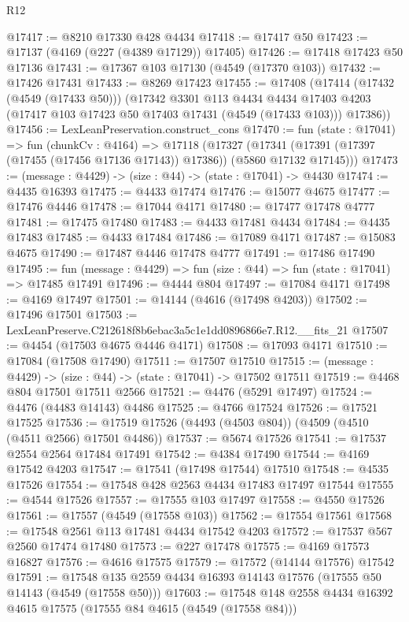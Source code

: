 \begin{lexlean}{R12}
\begin{coremodule}
@17417 := @8210 @17330 @428 @4434
@17418 := @17417 @50
@17423 := @17137 (@4169 (@227 (@4389 @17129)) @17405)
@17426 := @17418 @17423 @50 @17136
@17431 := @17367 @103 @17130 (@4549 (@17370 @103))
@17432 := @17426 @17431
@17433 := @8269 @17423
@17455 := @17408
    (@17414
      (@17432 (@4549 (@17433 @50)))
      (@17342
        @3301
        @113
        @4434
        @4434
        @17403
        @4203
        (@17417 @103 @17423 @50 @17403 @17431 (@4549 (@17433 @103)))
        @17386))
@17456 := LexLeanPreservation.construct_cons
@17470 := fun (state : @17041) =>
  fun (chunkCv : @4164) =>
  @17118
    (@17327 (@17341 (@17391 (@17397 (@17455 (@17456 @17136 @17143)) @17386)) (@5860 @17132 @17145)))
@17473 := (message : @4429) -> (size : @44) -> (state : @17041) -> @4430
@17474 := @4435 @16393
@17475 := @4433 @17474
@17476 := @15077 @4675
@17477 := @17476 @4446
@17478 := @17044 @4171
@17480 := @17477 @17478 @4777
@17481 := @17475 @17480
@17483 := @4433 @17481 @4434
@17484 := @4435 @17483
@17485 := @4433 @17484
@17486 := @17089 @4171
@17487 := @15083 @4675
@17490 := @17487 @4446 @17478 @4777
@17491 := @17486 @17490
@17495 := fun (message : @4429) => fun (size : @44) => fun (state : @17041) => @17485 @17491
@17496 := @4444 @804
@17497 := @17084 @4171
@17498 := @4169 @17497
@17501 := @14144 (@4616 (@17498 @4203))
@17502 := @17496 @17501
@17503 := LexLeanPreserve.C212618f8b6ebac3a5c1e1dd0896866e7.R12.__fits_21
@17507 := @4454 (@17503 @4675 @4446 @4171)
@17508 := @17093 @4171
@17510 := @17084 (@17508 @17490)
@17511 := @17507 @17510
@17515 := (message : @4429) -> (size : @44) -> (state : @17041) -> @17502 @17511
@17519 := @4468 @804 @17501 @17511 @2566
@17521 := @4476 (@5291 @17497)
@17524 := @4476 (@4483 @14143) @4486
@17525 := @4766 @17524
@17526 := @17521 @17525
@17536 := @17519 @17526 (@4493 (@4503 @804)) (@4509 (@4510 (@4511 @2566) @17501 @4486))
@17537 := @5674 @17526
@17541 := @17537 @2554 @2564 @17484 @17491
@17542 := @4384 @17490
@17544 := @4169 @17542 @4203
@17547 := @17541 (@17498 @17544) @17510
@17548 := @4535 @17526
@17554 := @17548 @428 @2563 @4434 @17483 @17497 @17544
@17555 := @4544 @17526
@17557 := @17555 @103 @17497
@17558 := @4550 @17526
@17561 := @17557 (@4549 (@17558 @103))
@17562 := @17554 @17561
@17568 := @17548 @2561 @113 @17481 @4434 @17542 @4203
@17572 := @17537 @567 @2560 @17474 @17480
@17573 := @227 @17478
@17575 := @4169 @17573 @16827
@17576 := @4616 @17575
@17579 := @17572 (@14144 @17576) @17542
@17591 := @17548 @135 @2559 @4434 @16393 @14143 @17576 (@17555 @50 @14143 (@4549 (@17558 @50)))
@17603 := @17548 @148 @2558 @4434 @16392 @4615 @17575 (@17555 @84 @4615 (@4549 (@17558 @84)))

\end{coremodule}
\end{lexlean}
